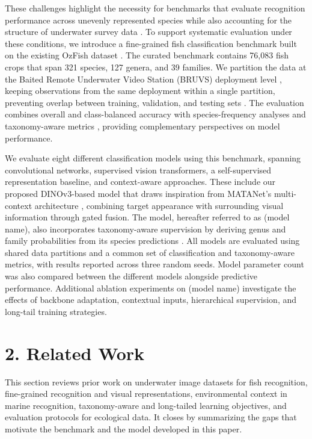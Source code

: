 \documentclass[preprint,12pt]{elsarticle}
\begin{document}
These challenges highlight the necessity for benchmarks that evaluate
recognition performance across unevenly represented species while also
accounting for the structure of underwater survey data
\cite{ref10}
\cite{ref13}
\cite{ref21}. To support systematic evaluation
under these conditions, we introduce a fine-grained fish classification
benchmark built on the existing OzFish dataset
\cite{ref22}. The curated benchmark contains
76,083 fish crops that span 321 species, 127 genera, and 39 families. We
partition the data at the Baited Remote Underwater Video Station (BRUVS)
deployment level \cite{ref4}, keeping
observations from the same deployment within a single partition,
preventing overlap between training, validation, and testing sets
\cite{ref17}
\cite{ref18}. The evaluation combines overall
and class-balanced accuracy with species-frequency analyses
\cite{ref16} and taxonomy-aware metrics
\cite{ref23}
\cite{ref24}, providing complementary
perspectives on model performance.

We evaluate eight different classification models using this benchmark,
spanning convolutional networks, supervised vision transformers, a
self-supervised representation baseline, and context-aware approaches.
These include our proposed DINOv3-based model
\cite{ref25} that draws inspiration from
MATANet's multi-context architecture
\cite{ref26}, combining target appearance with
surrounding visual information through gated fusion. The model,
hereafter referred to as (model name), also incorporates taxonomy-aware
supervision by deriving genus and family probabilities from its species
predictions \cite{ref24}
\cite{ref26}. All models are evaluated using
shared data partitions and a common set of classification and
taxonomy-aware metrics, with results reported across three random seeds.
Model parameter count was also compared between the different models
alongside predictive performance. Additional ablation experiments on
(model name) investigate the effects of backbone adaptation, contextual
inputs, hierarchical supervision, and long-tail training strategies.

\section*{2. Related Work}\label{related-work}

This section reviews prior work on underwater image datasets for fish
recognition, fine-grained recognition and visual representations,
environmental context in marine recognition, taxonomy-aware and
long-tailed learning objectives, and evaluation protocols for ecological
data. It closes by summarizing the gaps that motivate the benchmark and
the model developed in this paper.
\end{document}
